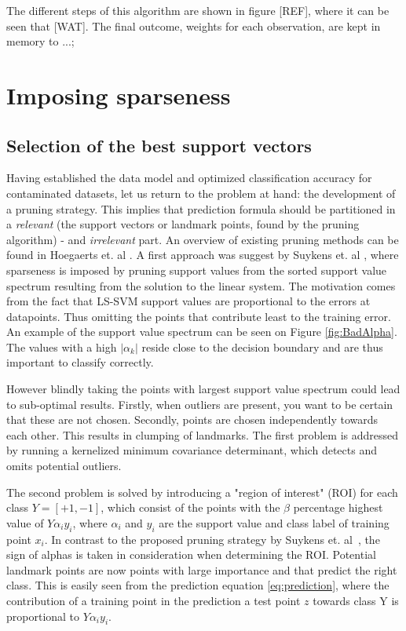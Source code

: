 \documentclass[preprint,12pt]{elsarticle}
\begin{document}
The different steps of this algorithm are shown in figure [REF], where it can be seen that [WAT]. The final outcome, weights for each observation, are kept in memory to ...;

\newpage
\section{Imposing sparseness}

\subsection{Selection of the best support vectors}

Having established the data model and optimized classification accuracy for contaminated datasets, let us return to the problem at hand: the development of a pruning strategy. This implies that prediction formula should be partitioned in a \textit{relevant} (the support vectors or landmark points, found by the pruning algorithm) - and \textit{irrelevant} part.  An overview of existing pruning methods can be found in Hoegaerts et. al \cite{hoegaerts2004comparison}. A first approach was suggest by Suykens et. al \cite{suykens2000sparse}, where  sparseness is imposed by pruning support values from the sorted support value spectrum resulting from the solution to the linear system.  The motivation comes from the fact that LS-SVM support values are proportional to the errors at datapoints. Thus omitting the points that contribute least to the training error. An example of the support value spectrum can be seen on Figure \ref{fig:BadAlpha}. The values with a high $|\alpha_k|$ reside close to the decision boundary and are thus important to classify correctly. 

However blindly taking the points with largest support value spectrum could lead to sub-optimal results. Firstly, when outliers are present, you want to be certain that these are not chosen. Secondly, points are chosen independently towards each other. This results in clumping of landmarks. The first problem is addressed by running a kernelized minimum covariance determinant, which detects and omits potential outliers. 

The second problem is solved by introducing a "region of interest" (ROI) for each class $Y = [+1,-1]$, which consist of the points with the $\beta$ percentage highest value of $Y \alpha_iy_i$, where $\alpha_i$ and $y_i$ are the support value and class label of training point $x_i$. In contrast to the proposed pruning strategy by Suykens et. al~\cite{suykens2000sparse}, the sign of alphas is taken in consideration when determining the ROI. Potential landmark points are now points with large importance and that predict the right class. This is easily seen from the prediction equation \eqref{eq:prediction}, where the contribution of a training point in the prediction a test point $z$ towards class Y is proportional to $Y \alpha_iy_i$. 
\end{document}
